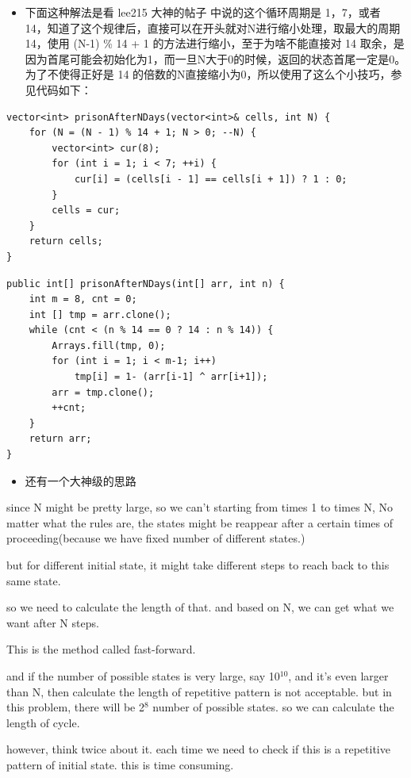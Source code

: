 \documentclass[9pt, b5paaper]{book}
\begin{document}
\begin{itemize}
\item 下面这种解法是看 lee215 大神的帖子 中说的这个循环周期是 1，7，或者 14，知道了这个规律后，直接可以在开头就对N进行缩小处理，取最大的周期 14，使用 (N-1) \% 14 + 1 的方法进行缩小，至于为啥不能直接对 14 取余，是因为首尾可能会初始化为1，而一旦N大于0的时候，返回的状态首尾一定是0。为了不使得正好是 14 的倍数的N直接缩小为0，所以使用了这么个小技巧，参见代码如下：
\end{itemize}
\begin{verbatim}
vector<int> prisonAfterNDays(vector<int>& cells, int N) {
    for (N = (N - 1) % 14 + 1; N > 0; --N) {
        vector<int> cur(8);
        for (int i = 1; i < 7; ++i) {
            cur[i] = (cells[i - 1] == cells[i + 1]) ? 1 : 0;
        }
        cells = cur;
    }
    return cells;
}
\end{verbatim}
\begin{verbatim}
public int[] prisonAfterNDays(int[] arr, int n) {
    int m = 8, cnt = 0;
    int [] tmp = arr.clone();
    while (cnt < (n % 14 == 0 ? 14 : n % 14)) { 
        Arrays.fill(tmp, 0);
        for (int i = 1; i < m-1; i++) 
            tmp[i] = 1- (arr[i-1] ^ arr[i+1]);
        arr = tmp.clone();
        ++cnt;
    }
    return arr;
}
\end{verbatim}
\begin{itemize}
\item 还有一个大神级的思路
\end{itemize}
since N might be pretty large, so we can’t starting from times 1 to times N, No matter what the rules are, the states might be reappear after a certain times of proceeding(because we have fixed number of different states.)

but for different initial state, it might take different steps to reach back to this same state.

so we need to calculate the length of that. and based on N, we can get what we want after N steps.

This is the method called fast-forward.

and if the number of possible states is very large, say 10$^{\text{10}}$, and it’s even larger than N, then calculate the length of repetitive pattern is not acceptable.
but in this problem, there will be 2$^{\text{8}}$ number of possible states. so we can calculate the length of cycle.

however, think twice about it. each time we need to check if this is a repetitive pattern of initial state. this is time consuming.
\end{document}
